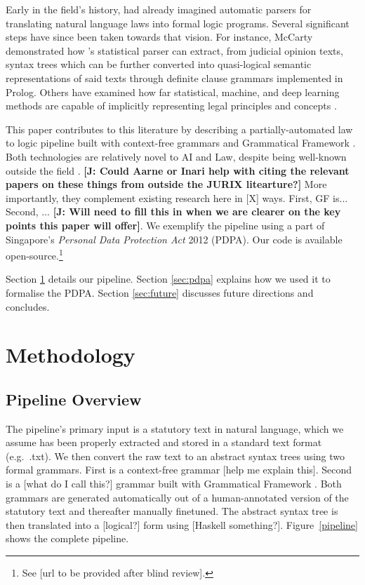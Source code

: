 \documentclass{IOS-Book-Article}
\newcommand{\todoj}[1]{{\color{red}\textbf{[J: #1]}}}
\begin{document}
Early in the field's history, \cite{bing_designing_1987} had already imagined automatic parsers for translating natural language laws into formal logic programs. Several significant steps have since been taken towards that vision. For instance, McCarty \cite{mccarty_deep_2007} demonstrated how \cite{collins_head-driven_2003}'s statistical parser can extract, from judicial opinion texts, syntax trees which can be further converted into quasi-logical semantic representations of said texts through definite clause grammars implemented in Prolog. Others have examined how far statistical, machine, and deep learning methods are capable of implicitly representing legal principles and concepts \cite{groendijk_neural_1992, de_maat_automatic_2008, winkels_automatic_2012, chalkidis_neural_2019, chalkidis_lexglue_2022}.

This paper contributes to this literature by describing a partially-automated law to logic pipeline built with context-free grammars \cite{} and Grammatical Framework \cite{}. Both technologies are relatively novel to AI and Law, despite being well-known outside the field \cite{}.
\todoj{Could Aarne or Inari help with citing the relevant papers on these things from outside the JURIX litearture?}
More importantly, they complement existing research here in [X] ways. First, GF is... Second, ...
\todoj{Will need to fill this in when we are clearer on the key points this paper will offer}. We exemplify the pipeline using a part of Singapore's \textit{Personal Data Protection Act} 2012 (PDPA). Our code is available open-source.\footnote{See [url to be provided after blind review].}

Section \ref{sec:methods} details our pipeline. Section \ref{sec:pdpa} explains how we used it to formalise the PDPA. Section \ref{sec:future} discusses future directions and concludes.

\section{Methodology}
\label{sec:methods}

\subsection{Pipeline Overview}

The pipeline's primary input is a statutory text in natural language, which we assume has been properly extracted and stored in a standard text format (e.g.\ .txt). We then convert the raw text to an abstract syntax trees using two formal grammars. First is a context-free grammar [help me explain this]. Second is a [what do I call this?] grammar built with Grammatical Framework \cite{}. Both grammars are generated automatically out of a human-annotated version of the statutory text and thereafter manually finetuned. The abstract syntax tree is then translated into a [logical?] form using [Haskell something?]. Figure~\ref{pipeline} shows the complete pipeline.
\end{document}
